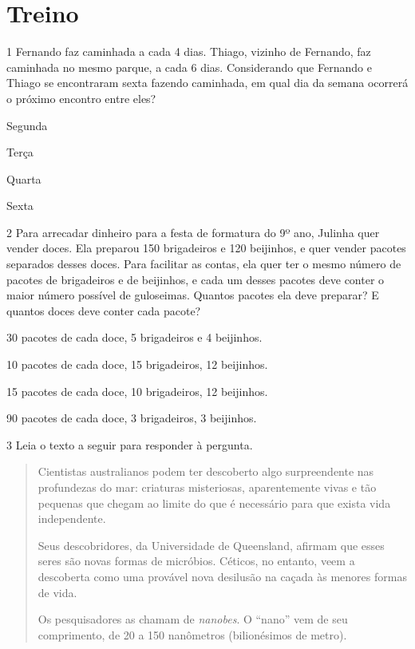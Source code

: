 \section{Treino}

\num{1} Fernando faz caminhada a cada 4 dias. Thiago, vizinho de
Fernando, faz caminhada no mesmo parque, a cada 6 dias. Considerando que
Fernando e Thiago se encontraram sexta fazendo caminhada, em qual dia da
semana ocorrerá o próximo encontro entre eles?

\begin{escolha}
\item Segunda
\item Terça
\item Quarta
\item Sexta
\end{escolha}

\num{2} Para arrecadar dinheiro para a festa de formatura do 9º ano,
Julinha quer vender doces. Ela preparou 150 brigadeiros e 120 beijinhos,
e quer vender pacotes separados desses doces. Para facilitar as contas,
ela quer ter o mesmo número de pacotes de brigadeiros e de beijinhos, e
cada um desses pacotes deve conter o maior número possível de guloseimas. 
Quantos pacotes ela deve preparar? E quantos doces deve conter cada 
pacote?   

\begin{escolha}
\item
  30 pacotes de cada doce, 5 brigadeiros e 4 beijinhos.
\item
  10 pacotes de cada doce, 15 brigadeiros, 12 beijinhos.
\item
  15 pacotes de cada doce, 10 brigadeiros, 12 beijinhos.
\item
  90 pacotes de cada doce, 3 brigadeiros, 3 beijinhos.
\end{escolha}

\pagebreak
\num{3} Leia o texto a seguir para responder à pergunta.

\begin{quote}
Cientistas australianos podem ter descoberto algo surpreendente nas
profundezas do mar: criaturas misteriosas, aparentemente vivas e tão
pequenas que chegam ao limite do que é necessário para que exista vida
independente.

Seus descobridores, da Universidade de Queensland, afirmam que esses
seres são novas formas de micróbios. Céticos, no entanto, veem a
descoberta como uma provável nova desilusão na caçada às menores formas
de vida.

Os pesquisadores as chamam de \textit{nanobes}. O ``nano'' vem de seu 
comprimento, de 20 a 150 nanômetros (bilionésimos de metro).

\end{quote}


